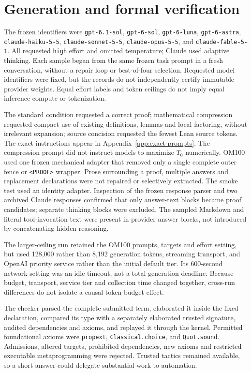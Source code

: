 \documentclass[11pt]{article}
\begin{document}
\section{Generation and formal verification}
\label{sec:methods-protocol}

The frozen identifiers were \texttt{gpt-6.1-sol}, \texttt{gpt-6-sol}, \texttt{gpt-6-luna}, \texttt{gpt-6-astra}, \texttt{claude-haiku-5-5}, \texttt{claude-sonnet-5-5}, \texttt{claude-opus-5-5}, and \texttt{claude-fable-5-1}. All requested \texttt{high} effort and omitted temperature; Claude used adaptive thinking. Each sample began from the same frozen task prompt in a fresh conversation, without a repair loop or best-of-four selection. Requested model identifiers were fixed, but the records do not independently certify immutable provider weights. Equal effort labels and token ceilings do not imply equal inference compute or tokenization.

The standard condition requested a correct proof; mathematical compression requested compact use of existing definitions, lemmas and local factoring, without irrelevant expansion; source concision requested the fewest Lean source tokens. The exact instructions appear in Appendix~\ref{app:exact-prompts}. The compression prompt did not instruct models to maximize $T_0$ numerically. OM100 used one frozen mechanical adapter that removed only a single complete outer fence or \texttt{<PROOF>} wrapper. Prose surrounding a proof, multiple answers and replacement declarations were not repaired or selectively extracted. The smoke test used an identity adapter. Inspection of the frozen response parser and two archived Claude responses confirmed that only answer-text blocks became proof candidates; separate thinking blocks were excluded. The sampled Markdown and literal tool-invocation text were present in provider answer blocks, not introduced by concatenating hidden reasoning.

The larger-ceiling run retained the OM100 prompts, targets and effort setting, but used 128,000 rather than 8,192 generation tokens, streaming transport, and OpenAI priority service rather than the initial default tier. Its 600-second network setting was an idle timeout, not a total generation deadline. Because budget, transport, service tier and collection time changed together, cross-run differences do not isolate a causal token-budget effect.

The checker parsed the complete submitted term, elaborated it inside the fixed declaration, compared its type with a separately elaborated trusted signature, audited dependencies and axioms, and replayed it through the kernel. Permitted foundational axioms were \texttt{propext}, \texttt{Classical.choice}, and \texttt{Quot.sound}. Admissions, altered targets, prohibited dependencies, new axioms and restricted executable metaprogramming were rejected. Trusted tactics remained available, so a short answer could delegate substantial work to automation.
\end{document}
